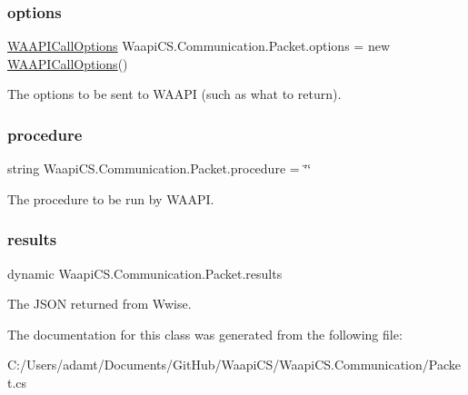 \subsubsection{\texorpdfstring{options}{options}}
{\footnotesize\ttfamily \mbox{\hyperlink{class_waapi_c_s_1_1_communication_1_1_w_a_a_p_i_call_options}{W\+A\+A\+P\+I\+Call\+Options}} Waapi\+C\+S.\+Communication.\+Packet.\+options = new \mbox{\hyperlink{class_waapi_c_s_1_1_communication_1_1_w_a_a_p_i_call_options}{W\+A\+A\+P\+I\+Call\+Options}}()}



The options to be sent to W\+A\+A\+PI (such as what to return). 

\mbox{\label{class_waapi_c_s_1_1_communication_1_1_packet_aff8c50917935b328e6095bb83d424bac}} 
\subsubsection{\texorpdfstring{procedure}{procedure}}
{\footnotesize\ttfamily string Waapi\+C\+S.\+Communication.\+Packet.\+procedure = \char`\"{}\char`\"{}}



The procedure to be run by W\+A\+A\+PI. 

\mbox{\label{class_waapi_c_s_1_1_communication_1_1_packet_a9dc9be78fb02e6ab862e7f27052217ff}} 
\subsubsection{\texorpdfstring{results}{results}}
{\footnotesize\ttfamily dynamic Waapi\+C\+S.\+Communication.\+Packet.\+results}



The J\+S\+ON returned from Wwise. 



The documentation for this class was generated from the following file\+:\begin{DoxyCompactItemize}
\item 
C\+:/\+Users/adamt/\+Documents/\+Git\+Hub/\+Waapi\+C\+S/\+Waapi\+C\+S.\+Communication/Packet.\+cs\end{DoxyCompactItemize}
